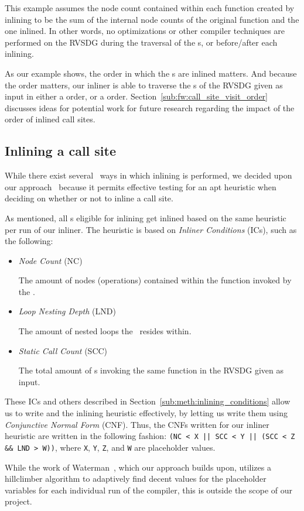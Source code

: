 This example assumes the node count contained within each function created by
inlining to be the sum of the internal node counts of the original function and
the one inlined. In other words, no optimizations or other compiler techniques
are performed on the RVSDG during the traversal of the \applyNode s, or
before/after each inlining.

As our example shows, the order in which the \applyNode s are inlined matters.
And because the order matters, our inliner is able to traverse the \applyNode s
of the RVSDG given as input in either a  order, or a  order.
Section~\ref{sub:fw:call_site_visit_order} discusses ideas for potential work
for future research regarding the impact of the order of inlined call sites.

\subsection{Inlining a call site}
\label{sub:scheme:inlining_apply_nodes}

While there exist several~\cite{GHCPaper,AdaptvStratInlSubst} ways in which
inlining is performed, we decided upon our
approach~\cite{AdaptvCompilAndInlingWaterman} because it permits effective
testing for an apt heuristic when deciding on whether or not to inline a call
site.

As mentioned, all \applyNode s eligible for inlining get inlined based on the
same heuristic per run of our inliner. The heuristic is based on \textit{Inliner
Conditions} (ICs), such as the following:

\begin{itemize}
	\item \textit{Node Count} (NC)

The amount of nodes (operations) contained within the function invoked by the
\applyNode .

	\item \textit{Loop Nesting Depth} (LND)

The amount of nested loops the \applyNode~resides within.

	\item \textit{Static Call Count} (SCC)

The total amount of \applyNode s invoking the same function in the RVSDG given
as input.
\end{itemize}

These ICs and others described in Section~\ref{sub:meth:inlining_conditions}
allow us to write and  the inlining heuristic effectively, by letting us
write them using \textit{Conjunctive Normal Form} (CNF). Thus, the CNFs written
for our inliner heuristic are written in the following fashion:
\lstinline"(NC < X || SCC < Y || (SCC < Z && LND > W))", where \lstinline!X!,
\lstinline!Y!, \lstinline!Z!, and \lstinline!W! are placeholder values.

While the work of Waterman~\cite{AdaptvCompilAndInlingWaterman}, which our
approach builds upon, utilizes a hillclimber algorithm to adaptively find decent
values for the placeholder variables for each individual run of the compiler,
this is outside the scope of our project.

